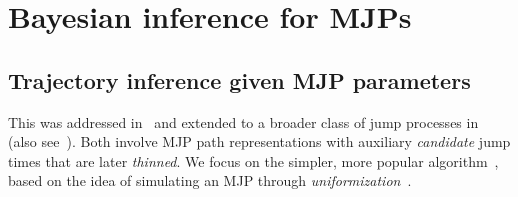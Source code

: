 \section{Bayesian inference for MJPs}
  \vspace{-.1in}
\subsection{Trajectory inference given MJP parameters}
This was addressed in~\cite{RaoTeh13}  
and extended to a broader class of 
jump processes %
in~\cite{RaoTeh12} (also see~\cite{FearnSher2006, 
Hobolth09, El_hay_gibbssampling}). %
Both involve MJP path representations with auxiliary 
{\em candidate} jump times that are later {\em thinned}.  We focus on 
the simpler, more popular {\algname} algorithm~\cite{RaoTeh13},
based on the idea of simulating an MJP through {\em uniformization}~\cite{Jen1953}. 

